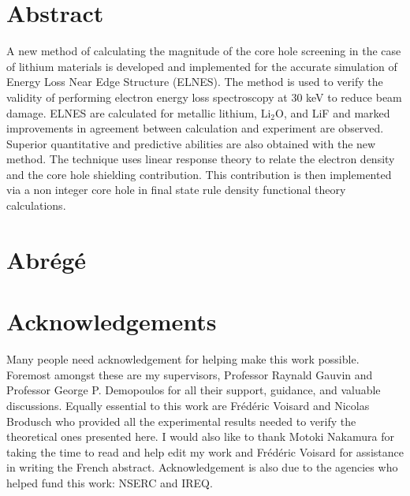 \documentclass[12pt]{report}
\begin{document}




\tableofcontents




\chapter*{Abstract}
\renewcommand{\thepage}{\roman{page}}%


A new method of calculating the magnitude of the core hole screening in the case of lithium materials is developed and implemented for the accurate simulation of Energy Loss Near Edge Structure (ELNES).  The method is used to verify the validity of performing electron energy loss spectroscopy at 30 keV to reduce beam damage.  ELNES are calculated for metallic lithium, $\mathrm{Li_2O}$, and LiF and marked improvements in agreement between calculation and experiment are observed. Superior quantitative and predictive abilities are also obtained with the new method.   The technique uses linear response theory to relate the electron density and the core hole shielding contribution.  This contribution is then implemented via a non integer core hole in final state rule density functional theory calculations.
\\

\chapter*{Abr\'eg\'e}



\chapter*{Acknowledgements}
Many people need acknowledgement for helping make this work possible.  Foremost amongst these are my supervisors,  Professor Raynald Gauvin and  Professor George P. Demopoulos for all their support, guidance, and valuable discussions.  Equally essential to this work are Fr\'ed\'eric Voisard and Nicolas Brodusch who provided all the experimental results needed to verify the theoretical ones presented here. I would also like to thank Motoki Nakamura  for taking the time to read and help edit my work and Fr\'ed\'eric Voisard for assistance in writing the French abstract. Acknowledgement is also due to the agencies who helped fund this work: NSERC and IREQ.  \\
\end{document}
